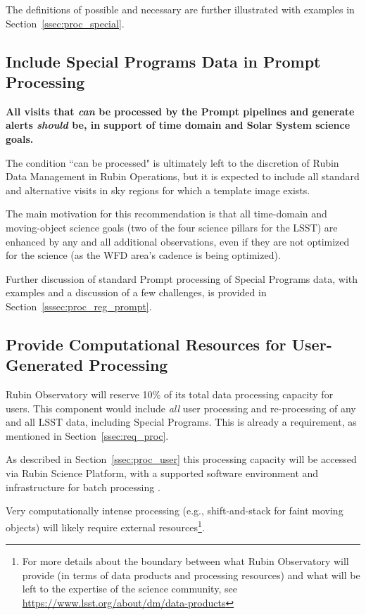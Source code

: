 The definitions of possible and necessary are further illustrated with examples in Section~\ref{ssec:proc_special}.


\subsection{Include Special Programs Data in Prompt Processing}\label{ssec:sci_pproc}

\textbf{All visits that \emph{can} be processed by the Prompt pipelines and generate 
alerts \emph{should} be, in support of time domain and Solar System science goals.}

The condition ``can be processed" is ultimately left to the discretion of
Rubin Data Management in Rubin Operations, but it is expected to include
all standard and alternative visits in sky regions for which a template image exists.

The main motivation for this recommendation is that all time-domain and 
moving-object science goals (two of the four science pillars for the LSST) are
enhanced by any and all additional observations, even if they are not
optimized for the science (as the WFD area's cadence is being optimized).

Further discussion of standard Prompt processing of Special Programs data, with
examples and a discussion of a few challenges,
is provided in Section~\ref{sssec:proc_reg_prompt}.

\subsection{Provide Computational Resources for User-Generated Processing}\label{ssec:sci_comp}

Rubin Observatory will reserve 10\% of its total data processing capacity for users.
This component would include {\it all} user processing and re-processing of any and 
all LSST data, including Special Programs. 
This is already a requirement, as mentioned in Section~\ref{ssec:req_proc}.

As described in Section~\ref{ssec:proc_user} this processing capacity will be 
accessed via Rubin Science Platform, with a supported software environment and 
infrastructure for batch processing .

Very computationally intense processing (e.g., shift-and-stack for faint moving 
objects) will likely require external resources\footnote{For more details about 
the boundary between what Rubin Observatory will provide (in terms of data products 
and processing resources) and what will be left to the expertise of the science community, 
see \url{https://www.lsst.org/about/dm/data-products}}.

